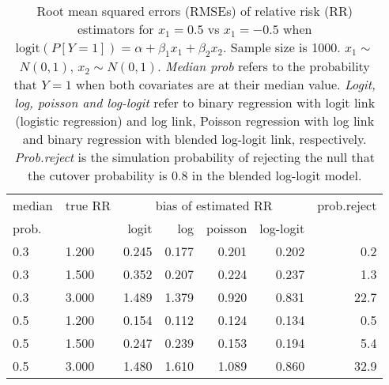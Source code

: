\documentclass[12pt,a4paper]{article}
\begin{document}
\begin{table}[H] 
\small\sf\centering 
\caption{Root mean squared errors (RMSEs) of relative risk (RR) estimators for $x_1=0.5$ vs $x_1=-0.5$ when $\mbox{logit}(P[Y=1])=\alpha+\beta_1 x_1 + \beta_2 x_2$. Sample size is 1000. $x_1 \sim $$N(0,1)$, $x_2 \sim N(0,1)$. {\it Median prob} refers to the probability that $Y=1$ when both covariates are at their median value. {\it Logit, log, poisson and log-logit} refer to binary regression with logit link (logistic regression) and log link, Poisson regression with log link and binary regression with blended log-logit link, respectively. {\it Prob.reject} is the simulation probability of rejecting the null that the cutover probability is $0.8$ in the blended log-logit model.} 
\begin{tabular}{llrrrrr} 
\toprule 
median & true RR & \multicolumn{4}{c}{bias of estimated RR} & prob.reject \\ 
prob. & & logit & log & poisson & log-logit  & \\ \midrule 
0.3 & 1.200 & 0.245 & 0.177 & 0.201 & 0.202 &  0.2 \\  
0.3 & 1.500 & 0.352 & 0.207 & 0.224 & 0.237 &  1.3 \\  
0.3 & 3.000 & 1.489 & 1.379 & 0.920 & 0.831 & 22.7 \\  
0.5 & 1.200 & 0.154 & 0.112 & 0.124 & 0.134 &  0.5 \\  
0.5 & 1.500 & 0.247 & 0.239 & 0.153 & 0.194 &  5.4 \\  
0.5 & 3.000 & 1.480 & 1.610 & 1.089 & 0.860 & 32.9 \\  
\bottomrule 
\end{tabular} 
\end{table} 
\end{document}
